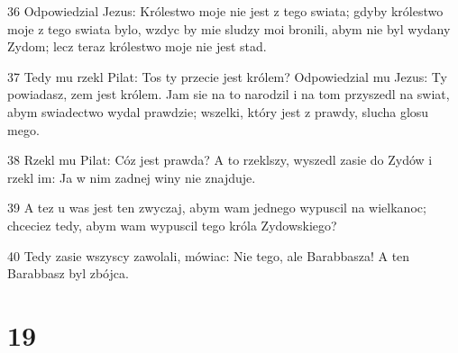 \par 36 Odpowiedzial Jezus: Królestwo moje nie jest z tego swiata; gdyby królestwo moje z tego swiata bylo, wzdyc by mie sludzy moi bronili, abym nie byl wydany Zydom; lecz teraz królestwo moje nie jest stad.
\par 37 Tedy mu rzekl Pilat: Tos ty przecie jest królem? Odpowiedzial mu Jezus: Ty powiadasz, zem jest królem. Jam sie na to narodzil i na tom przyszedl na swiat, abym swiadectwo wydal prawdzie; wszelki, który jest z prawdy, slucha glosu mego.
\par 38 Rzekl mu Pilat: Cóz jest prawda? A to rzeklszy, wyszedl zasie do Zydów i rzekl im: Ja w nim zadnej winy nie znajduje.
\par 39 A tez u was jest ten zwyczaj, abym wam jednego wypuscil na wielkanoc; chceciez tedy, abym wam wypuscil tego króla Zydowskiego?
\par 40 Tedy zasie wszyscy zawolali, mówiac: Nie tego, ale Barabbasza! A ten Barabbasz byl zbójca.

\chapter{19}

